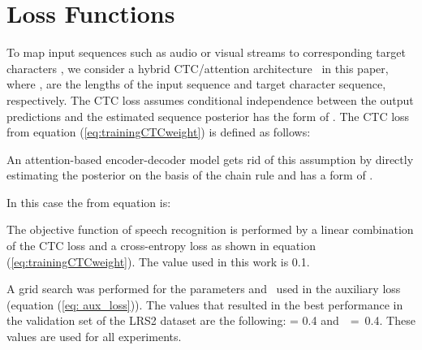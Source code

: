\documentclass[twocolumn]{article}
\begin{document}
\section{Loss Functions}
\label{sec:SI_loss}
To map input sequences  such as audio or visual streams to corresponding target characters , we consider a hybrid CTC/attention architecture~\cite{watanabe2017hybrid} in this paper, where ,  are the lengths of the input sequence and target character sequence, respectively. The CTC loss assumes conditional independence between the output predictions and the estimated sequence posterior has the form of . The CTC loss from equation (\ref{eq:trainingCTCweight}) is defined as follows:


An attention-based encoder-decoder model gets rid of this assumption by directly estimating the posterior on the basis of the chain rule and has a form of .

In this case the  from equation is:


The objective function of speech recognition is performed by a linear combination of the CTC loss and a cross-entropy loss as shown in equation (\ref{eq:trainingCTCweight}). The  value used in this work is 0.1.

A grid search was performed for the parameters  and~ used in the auxiliary loss (equation (\ref{eq: aux_loss})). The values that resulted in the best performance in the validation set of the LRS2 dataset are the following:  = 0.4 and~~=~0.4. These values are used for all experiments.
\end{document}
